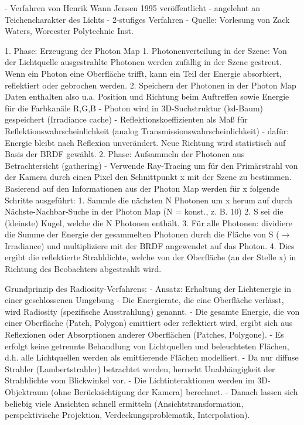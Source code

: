 \documentclass[10pt,landscape]{article}
\makeatletter
\renewcommand{\subsection}{\@startsection{subsection}{2}{0mm}%
                                {-1explus -.5ex minus -.2ex}%
                                {0.5ex plus .2ex}%
                                {\normalfont\normalsize\bfseries}}
\makeatother
\begin{document}
\begin{multicols}{3}
  - Verfahren von Henrik Wann Jensen 1995 veröffentlicht
  - angelehnt an Teichencharakter des Lichts
  - 2-stufiges Verfahren
  - Quelle: Vorlesung von Zack Waters, Worcester Polytechnic Inst.
  
  
  1. Phase: Erzeugung der Photon Map
  1. Photonenverteilung in der Szene: Von der Lichtquelle ausgestrahlte Photonen werden zufällig in der Szene gestreut. Wenn ein Photon eine Oberfläche trifft, kann ein Teil der Energie absorbiert, reflektiert oder gebrochen werden.
  2. Speichern der Photonen in der Photon Map Daten enthalten also u.a. Position und Richtung beim Auftreffen sowie Energie für die Farbkanäle R,G,B
  - Photon wird in 3D-Suchstruktur (kd-Baum) gespeichert (Irradiance cache) 
  - Reflektionskoeffizienten als Maß für Reflektionswahrscheinlichkeit (analog Transmissionswahrscheinlichkeit) 
  - dafür: Energie bleibt nach Reflexion unverändert. Neue Richtung wird statistisch auf Basis der BRDF gewählt.
  2. Phase: Aufsammeln der Photonen aus Betrachtersicht (gathering)
  - Verwende Ray-Tracing um für den Primärstrahl von der Kamera durch einen Pixel den Schnittpunkt x mit der Szene zu bestimmen. Basierend auf den Informationen aus der Photon Map werden für x folgende Schritte ausgeführt:
  1. Sammle die nächsten N Photonen um x herum auf durch Nächste-Nachbar-Suche in der Photon Map (N = konst., z. B. 10)
  2. S sei die (kleinste) Kugel, welche die N Photonen enthält.
  3. Für alle Photonen: dividiere die Summe der Energie der gesammelten Photonen durch die Fläche von S ($\rightarrow$ Irradiance) und multipliziere mit der  BRDF angewendet auf das Photon.
  4. Dies ergibt die reflektierte Strahldichte, welche von der Oberfläche (an der Stelle x) in Richtung des Beobachters abgestrahlt wird.
  
  Grundprinzip des Radiosity-Verfahrens:
  - Ansatz: Erhaltung der Lichtenergie in einer geschlossenen Umgebung
  - Die Energierate, die eine Oberfläche verlässt, wird Radiosity (spezifische Ausstrahlung) genannt.
  - Die gesamte Energie, die von einer Oberfläche (Patch, Polygon) emittiert oder reflektiert wird, ergibt sich aus Reflexionen oder Absorptionen anderer Oberflächen (Patches, Polygone).
  - Es erfolgt keine getrennte Behandlung von Lichtquellen und beleuchteten Flächen, d.h. alle Lichtquellen werden als emittierende Flächen modelliert.
  - Da nur diffuse Strahler (Lambertstrahler) betrachtet werden, herrscht Unabhängigkeit der Strahldichte vom Blickwinkel vor.
  - Die Lichtinteraktionen werden im 3D-Objektraum (ohne Berücksichtigung der Kamera) berechnet.
  - Danach lassen sich beliebig viele Ansichten schnell ermitteln (Ansichtstransformation, perspektivische Projektion, Verdeckungsproblematik, Interpolation).
  

\end{multicols}
\end{document}
